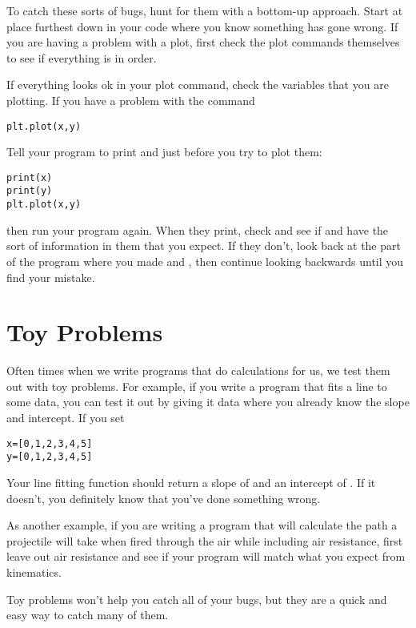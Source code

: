 To catch these sorts of bugs, hunt for them with a bottom-up approach.  Start at place furthest down in your code where you know something has gone wrong.  If you are having a problem with a plot, first check the plot commands themselves to see if everything is in order.

If everything looks ok in your plot command, check the variables that you are plotting.  If you have a problem with the command
\begin{Verbatim}
plt.plot(x,y)
\end{Verbatim}

Tell your program to print  and  just before you try to plot them:
\begin{Verbatim}
print(x)
print(y)
plt.plot(x,y)

\end{Verbatim}
then run your program again. When they print, check and see if  and  have the sort of information in them that you expect.  If they don't, look back at the part of the program where you made  and , then continue looking backwards until you find your mistake.

\section{Toy Problems}
Often times when we write programs that do calculations for us, we test them out with toy problems.  For example, if you write a program that fits a line to some data, you can test it out by giving it data where you already know the slope and intercept.  If you set
\begin{Verbatim}
x=[0,1,2,3,4,5]
y=[0,1,2,3,4,5]
\end{Verbatim}
Your line fitting function should return a slope of  and an intercept of . If it doesn't, you definitely know that you've done something wrong.

As another example, if you are writing a program that will calculate the path a projectile will take when fired through the air while including air resistance, first leave out air resistance and see if your program will match what you expect from kinematics.

Toy problems won't help you catch all of your bugs, but they are a quick and easy way to catch many of them.

